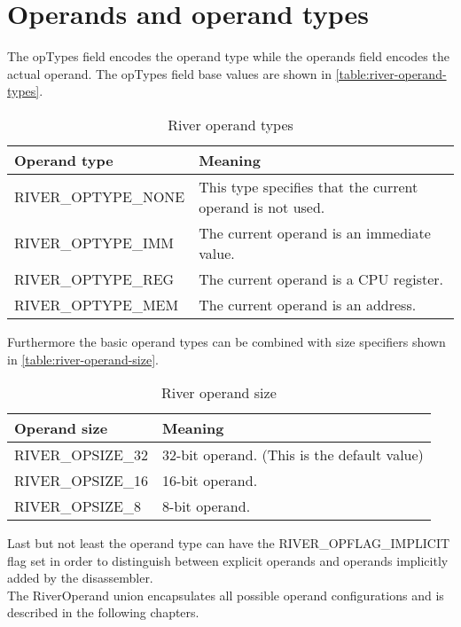 \documentclass[12pt]{report}
\begin{document}
\section{Operands and operand types}
\label{sec:operands-and-operand-types}
The opTypes field encodes the operand type while the operands field encodes the actual operand. The opTypes field base values are shown in \autoref{table:river-operand-types}.\\
\begin{table}[H]
	\begin{tabular}{| p{6cm} | p{10cm} |}
		\hline
		\textbf{Operand type} & \textbf{Meaning}\\ \hline
		RIVER_OPTYPE_NONE & This type specifies that the current operand is not used.\\ \hline
		RIVER_OPTYPE_IMM & The current operand is an immediate value.\\ \hline
		RIVER_OPTYPE_REG & The current operand is a CPU register.\\ \hline
		RIVER_OPTYPE_MEM & The current operand is an address.\\ \hline
	\end{tabular}
	\caption{River operand types}
	\label{table:river-operand-types}
\end{table}
Furthermore the basic operand types can be combined with size specifiers shown in \autoref{table:river-operand-size}.\\
\begin{table}[H]
	\begin{tabular}[t]{| p{6cm} | p{10cm} |}
		\hline
		\textbf{Operand size} & \textbf{Meaning}\\ \hline
		RIVER_OPSIZE_32 & 32-bit operand. (This is the default value)\\ \hline
		RIVER_OPSIZE_16 & 16-bit operand.\\ \hline
		RIVER_OPSIZE_8 & 8-bit operand.\\ \hline
	\end{tabular}
	\caption{River operand size}
	\label{table:river-operand-size}
\end{table}
Last but not least the operand type can have the RIVER_OPFLAG_IMPLICIT flag set in order to distinguish between explicit operands and operands implicitly added by the disassembler.\\
\newline
The RiverOperand union encapsulates all possible operand configurations and is described in the following chapters.\\
\end{document}
